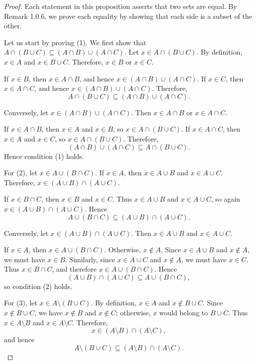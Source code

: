 \begin{proof}
   Each statement in this proposition asserts that two sets are equal. By Remark 1.0.6, we prove each equality by showing that each side is a subset of the other.

   Let us start by proving (1). We first show that $A \cap (B \cup C) \subseteq (A \cap B) \cup (A \cap C)$. Let $x \in A \cap (B \cup C)$. By definition, $x \in A$ and $x \in B \cup C$. Therefore, $x \in B$ or $x \in C$.

   If $x \in B$, then $x \in A \cap B$, and hence $x \in (A \cap B) \cup (A \cap C)$. If $x \in C$, then $x \in A \cap C$, and hence $x \in (A \cap B) \cup (A \cap C)$. Therefore, \[A \cap (B \cup C) \subseteq (A \cap B) \cup (A \cap C).\]

   Conversely, let $x \in (A \cap B) \cup (A \cap C)$. Then $x \in A \cap B$ or $x \in A \cap C$.

   If $x \in A \cap B$, then $x \in A$ and $x \in B$, so $x \in A \cap (B \cup C)$. If $x \in A \cap C$, then $x \in A$ and $x \in C$, so $x \in A \cap (B \cup C)$. Therefore, \[(A \cap B) \cup (A \cap C) \subseteq A \cap (B \cup C).\] Hence condition (1) holds.

   For (2), let $x \in A \cup (B \cap C)$. If $x \in A$, then $x \in A \cup B$ and $x \in A \cup C$. Therefore, $x \in (A \cup B) \cap (A \cup C)$.

   If $x \in B \cap C$, then $x \in B$ and $x \in C$. Thus $x \in A \cup B$ and $x \in A \cup C$, so again $x \in (A \cup B) \cap (A \cup C)$. Hence \[A \cup (B \cap C) \subseteq (A \cup B) \cap (A \cup C).\]

   Conversely, let $x \in (A \cup B) \cap (A \cup C)$. Then $x \in A \cup B$ and $x \in A \cup C$.

   If $x \in A$, then $x \in A \cup (B \cap C)$. Otherwise, $x \notin A$. Since $x \in A \cup B$ and $x \notin A$, we must have $x \in B$. Similarly, since $x \in A \cup C$ and $x \notin A$, we must have $x \in C$. Thus $x \in B \cap C$, and therefore $x \in A \cup (B \cap C)$. Hence \[(A \cup B) \cap (A \cup C) \subseteq A \cup (B \cap C),\] so condition (2) holds.

   For (3), let $x \in A \setminus (B \cup C)$. By definition, $x \in A$ and $x \notin B \cup C$. Since $x \notin B \cup C$, we have $x \notin B$ and $x \notin C$; otherwise, $x$ would belong to $B \cup C$. Thus $x \in A \setminus B$ and $x \in A \setminus C$. Therefore, \[x \in (A \setminus B) \cap (A \setminus C),\] and hence \[A \setminus (B \cup C) \subseteq (A \setminus B) \cap (A \setminus C).\]


\end{proof}
